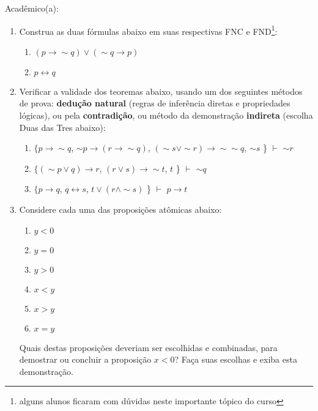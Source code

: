 \documentclass[a4paper,12pt]{article}
\begin{document}


\vskip 0.5cm Acadêmico(a): \hrulefill%


\begin{enumerate}

\item Construa as duas fórmulas abaixo em suas respectivas FNC e FND\footnote{alguns alunos ficaram com dúvidas neste importante tópico do curso}:
\begin{enumerate}
\setlength{\itemsep}{-3pt}
\item  $(p\rightarrow \sim q)  \vee (\sim q \rightarrow p) $
\item  $p \leftrightarrow q $
\end{enumerate}

\item Verificar a validade dos teoremas abaixo, usando um dos seguintes métodos de prova:  \textbf{dedução natural}  (regras de inferência diretas e propriedades lógicas), ou pela \textbf{contradição}, ou   método da demonstração \textbf{indireta} (escolha Duas das Tres abaixo):


\begin{enumerate}
\setlength{\itemsep}{-2pt} 
 \item $\{ p\rightarrow \sim q$, $\sim p \rightarrow (r \rightarrow \sim q)$, $(\sim s \vee \sim r)\rightarrow \sim \sim q$, $\sim s$ \} {\bf $\vdash $} $\sim r$

\item $\{(\sim p\vee q) \rightarrow r$,  $(r \vee s)\rightarrow \sim t$, $t$ \} {\bf $\vdash $} $\sim q$

\item $\{ p\rightarrow q$, $q \leftrightarrow s$, $t\vee (r\wedge \sim s)$ \} {\bf $\vdash $} $p \rightarrow t$






\end{enumerate}

\item Considere cada uma das proposições atômicas abaixo:
\begin{enumerate}
\setlength{\itemsep}{-2pt} 
\item $y < 0$
\item $y = 0$
\item $y > 0$
\item $x < y$
\item $x > y$
\item $x = y$
\end{enumerate}
Quais destas proposições deveriam ser escolhidas e combinadas, para
demostrar ou concluir a proposição $x < 0$? Faça suas escolhas e exiba esta demonstração.



\end{enumerate}
\end{document}
